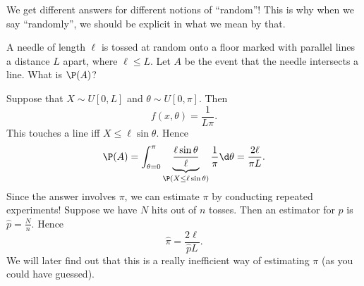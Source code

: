 \documentclass[a4paper]{article}
\begin{document}
\begin{eg}
\begin{enumerate}
\begin{center}
      \end{center}
  \end{enumerate}
  We get different answers for different notions of ``random''! This is why when we say ``randomly'', we should be explicit in what we mean by that.
\end{eg}

\begin{eg}
  A needle of length $\ell$ is tossed at random onto a floor marked with parallel lines a distance $L$ apart, where $\ell \leq L$. Let $A$ be the event that the needle intersects a line. What is $\P(A)$?
  \begin{center}
  \end{center}
  Suppose that $X\sim U[0, L]$ and $\theta\sim U[0, \pi]$. Then
  \[
    f(x, \theta) = \frac{1}{L\pi}.
  \]
  This touches a line iff $X \leq \ell \sin \theta$. Hence
  \[
    \P(A) = \int_{\theta = 0}^\pi \underbrace{\frac{\ell \sin \theta}{\ell}}_{\P(X \leq \ell\sin \theta)}\frac{1}{\pi}\d \theta = \frac{2\ell }{\pi L}.
  \]
  Since the answer involves $\pi$, we can estimate $\pi$ by conducting repeated experiments! Suppose we have $N$ hits out of $n$ tosses. Then an estimator for $p$ is $\hat{p} = \frac{N}{n}$. Hence
  \[
    \hat{\pi} = \frac{2\ell}{\hat{p}L}.
  \]
  We will later find out that this is a really inefficient way of estimating $\pi$ (as you could have guessed).
\end{eg}
\end{document}
